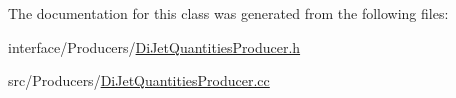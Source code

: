 The documentation for this class was generated from the following files:\begin{DoxyCompactItemize}
\item 
interface/Producers/\hyperlink{DiJetQuantitiesProducer_8h}{DiJetQuantitiesProducer.h}\item 
src/Producers/\hyperlink{DiJetQuantitiesProducer_8cc}{DiJetQuantitiesProducer.cc}\end{DoxyCompactItemize}
